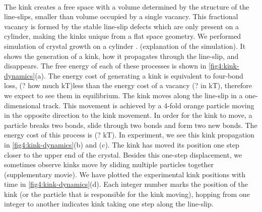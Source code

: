 \documentclass[12pt]{article}
\begin{document}
\paragraph{}
The kink creates a free space with a volume determined by the structure of the line-slips, smaller than volume occupied by a single vacancy. This fractional vacancy is formed by the stable line-slip defects which are only present on a cylinder, making the kinks unique from a flat space geometry. We performed simulation of crystal growth on a cylinder . (explanation of the simulation). It shows the generation of a kink, how it propagates through the line-slip, and disappears. The free energy of each of these processes is shown in \ref{fig4:kink-dynamics}(a). The energy cost of generating a kink is equivalent to four-bond loss, (? how much kT)less than the energy cost of a vacancy (? in kT), therefore we expect to see them in equilibrium. The kink moves along the line-slip in a one-dimensional track. This movement is achieved by a 4-fold orange particle moving in the opposite direction to the kink movement. In order for the kink to move, a particle breaks two bonds, slide through two bonds and form two new bonds. The energy cost of this process is (? kT). In experiment, we see this kink propagation in \ref{fig4:kink-dynamics}(b) and (c). The kink has moved its position one step closer to the upper end of the crystal. Besides this one-step displacement, we sometimes observe kinks move by sliding multiple particles together (supplementary movie). We have plotted the experimental kink positions with time in \ref{fig4:kink-dynamics}(d). Each integer number marks the position of the kink (or the particle that is responsible for the kink moving), hopping from one integer to another indicates kink taking one step along the line-slip. 
\end{document}

